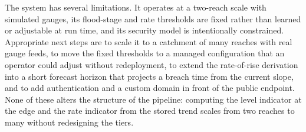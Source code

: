 \documentclass[conference]{IEEEtran}
\begin{document}
The system has several limitations. It operates at a two-reach scale with simulated gauges, its flood-stage and rate thresholds are fixed rather than learned or adjustable at run time, and its security model is intentionally constrained. Appropriate next steps are to scale it to a catchment of many reaches with real gauge feeds, to move the fixed thresholds to a managed configuration that an operator could adjust without redeployment, to extend the rate-of-rise derivation into a short forecast horizon that projects a breach time from the current slope, and to add authentication and a custom domain in front of the public endpoint. None of these alters the structure of the pipeline: computing the level indicator at the edge and the rate indicator from the stored trend scales from two reaches to many without redesigning the tiers.
\end{document}
